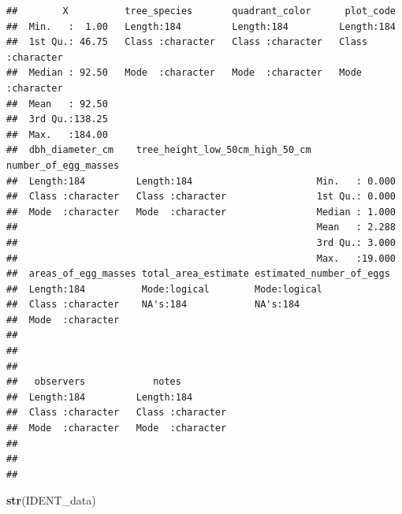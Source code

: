 \documentclass[
]{article}
\newenvironment{Shaded}{\begin{snugshade}}{\end{snugshade}}
\newcommand{\FunctionTok}[1]{\textcolor[rgb]{0.13,0.29,0.53}{\textbf{#1}}}
\newcommand{\NormalTok}[1]{#1}
\begin{document}
\begin{verbatim}
##        X          tree_species       quadrant_color      plot_code        
##  Min.   :  1.00   Length:184         Length:184         Length:184        
##  1st Qu.: 46.75   Class :character   Class :character   Class :character  
##  Median : 92.50   Mode  :character   Mode  :character   Mode  :character  
##  Mean   : 92.50                                                           
##  3rd Qu.:138.25                                                           
##  Max.   :184.00                                                           
##  dbh_diameter_cm    tree_height_low_50cm_high_50_cm number_of_egg_masses
##  Length:184         Length:184                      Min.   : 0.000      
##  Class :character   Class :character                1st Qu.: 0.000      
##  Mode  :character   Mode  :character                Median : 1.000      
##                                                     Mean   : 2.288      
##                                                     3rd Qu.: 3.000      
##                                                     Max.   :19.000      
##  areas_of_egg_masses total_area_estimate estimated_number_of_eggs
##  Length:184          Mode:logical        Mode:logical            
##  Class :character    NA's:184            NA's:184                
##  Mode  :character                                                
##                                                                  
##                                                                  
##                                                                  
##   observers            notes          
##  Length:184         Length:184        
##  Class :character   Class :character  
##  Mode  :character   Mode  :character  
##                                       
##                                       
## 
\end{verbatim}

\begin{Shaded}
\begin{Highlighting}[]
\FunctionTok{str}\NormalTok{(IDENT\_data)}
\end{Highlighting}
\end{Shaded}
\end{document}
